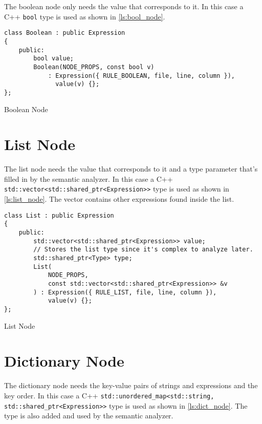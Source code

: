 The boolean node only needs the value that corresponds to it. In this case a C++ \texttt{bool} type is used as shown in
\autoref{ls:bool_node}.

\begin{listing}[H]
\begin{verbatim}
class Boolean : public Expression
{
    public:
        bool value;
        Boolean(NODE_PROPS, const bool v)
            : Expression({ RULE_BOOLEAN, file, line, column }),
              value(v) {};
};
\end{verbatim}
\caption{Boolean Node}
\label{ls:bool_node}
\end{listing}

\section{List Node}

The list node needs the value that corresponds to it and a type parameter that's filled in by the semantic analyzer.
In this case a C++ \texttt{std::vector<std::shared\_ptr<Expression>>} type is used as shown in \autoref{ls:list_node}.
The vector contains other expressions found inside the list.

\begin{listing}[H]
\begin{verbatim}
class List : public Expression
{
    public:
        std::vector<std::shared_ptr<Expression>> value;
        // Stores the list type since it's complex to analyze later.
        std::shared_ptr<Type> type;
        List(
            NODE_PROPS,
            const std::vector<std::shared_ptr<Expression>> &v
        ) : Expression({ RULE_LIST, file, line, column }),
            value(v) {};
};
\end{verbatim}
\caption{List Node}
\label{ls:list_node}
\end{listing}

\section{Dictionary Node}

The dictionary node needs the key-value pairs of strings and expressions and the key order. In this case a C++ \texttt{std::unordered\_map<std::string, std::shared\_ptr<Expression>>} type is used as shown in \autoref{ls:dict_node}. The type is also added and used by the semantic analyzer.

